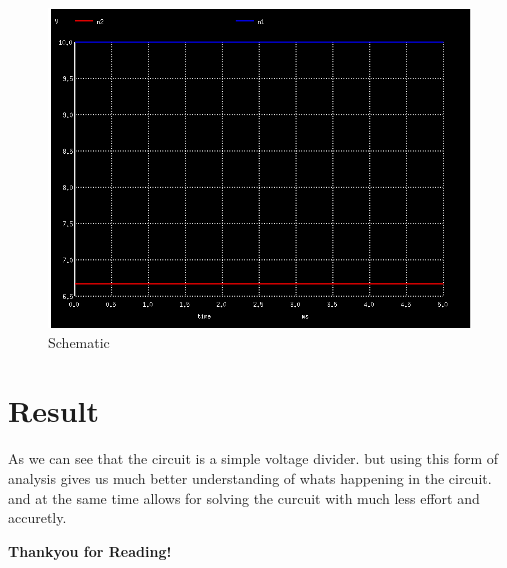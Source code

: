 \documentclass[a4paper,12pt]{article}
\begin{document}
\begin{figure}[h!]
\centering
\includegraphics[width=1\textwidth]{011.png}
\caption{Schematic}
\end{figure}

\section{Result}
As we can see that the circuit is a simple voltage divider. but using this form of analysis gives us much better understanding of whats happening in the circuit. and at the same time allows for solving the curcuit with much less effort and accuretly.

\newpage
\centering
\textbf{Thankyou for Reading!}
\end{document}
